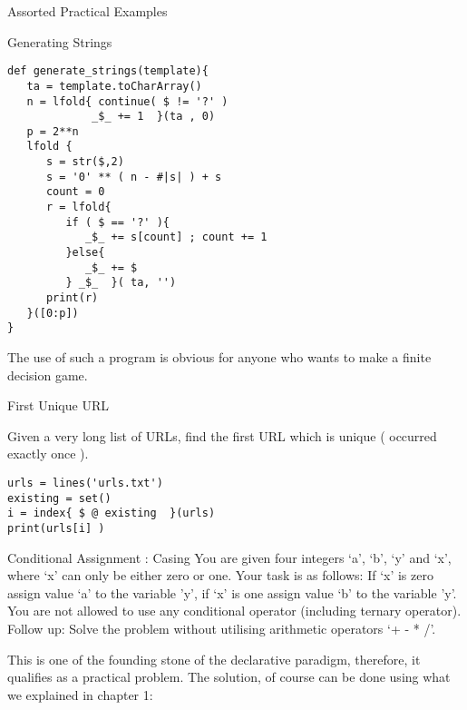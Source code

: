 \begin{section}{Assorted Practical Examples}
\begin{subsection}{Generating Strings}
\begin{center}\begin{minipage}{\linewidth}
\begin{lstlisting}[style=JexlStyle]
def generate_strings(template){
   ta = template.toCharArray()
   n = lfold{ continue( $ != '?' )
             _$_ += 1  }(ta , 0)
   p = 2**n 
   lfold {
      s = str($,2)
      s = '0' ** ( n - #|s| ) + s 
      count = 0 
      r = lfold{ 
         if ( $ == '?' ){
            _$_ += s[count] ; count += 1  
         }else{
            _$_ += $
         } _$_  }( ta, '')
      print(r)     
   }([0:p])      
}
\end{lstlisting}  
\end{minipage}\end{center}

The use of such a program is obvious for anyone who wants to make
a finite decision game.
\end{subsection}

\begin{subsection}{First Unique URL}

Given a very long list of URLs, find the first URL which is unique ( occurred exactly once ). 
\begin{center}\begin{minipage}{\linewidth}
\begin{lstlisting}[style=JexlStyle]
urls = lines('urls.txt')
existing = set()
i = index{ $ @ existing  }(urls)
print(urls[i] )
\end{lstlisting}  
\end{minipage}\end{center}

\end{subsection}

\begin{subsection}{Conditional Assignment : Casing }
You are given four integers `a', `b', `y' and `x', 
where `x' can only be either zero or one. 
Your task is as follows: 
If `x' is zero assign value `a' to the variable 'y', if `x' is one assign value `b' to the variable 'y'. 
You are not allowed to use any conditional operator (including ternary operator). 
Follow up: Solve the problem without utilising arithmetic operators `+ - * /'.

This is one of the founding stone of the declarative paradigm, therefore, it qualifies
as a practical problem. The solution, of course can be done using what we explained in chapter 1:


\end{subsection}
\end{section}
